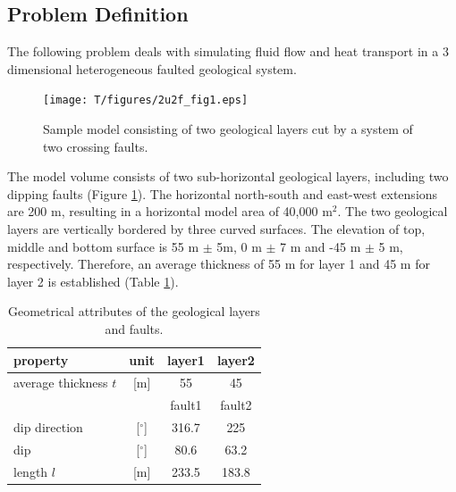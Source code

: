 \subsection{Problem Definition}

The following problem deals with simulating fluid flow and heat transport in a 3 dimensional heterogeneous faulted geological system.  
\label{sec:model}
\begin{figure}[htbp]
    \begin{center}
        \texttt{[image: T/figures/2u2f\_fig1.eps]}
        \caption{Sample model consisting of two geological layers cut by a system of two crossing faults.}
        \label{fig1}
    \end{center}
\end{figure}

The model volume consists of two sub-horizontal geological layers, including two dipping faults (Figure \ref{fig1}). The horizontal north-south and east-west extensions are 200 m, resulting in a horizontal model area of 40,000 m$^{2}$. The two geological layers are vertically bordered by three curved surfaces. The elevation of top, middle and bottom surface is 55 m $\pm{}$ 5m, 0 m $\pm{}$ 7 m and -45 m $\pm{}$ 5 m, respectively.  Therefore, an average thickness of 55 m for layer 1 and 45 m for layer 2 is established (Table \ref{tab:geometry}).

\begin{table}[htbp]
    \begin{center}
        \caption{Geometrical attributes of the geological layers and faults.}
        \begin{tabular}{lccc}
          \hline
          property & unit & layer1 & layer2\\
          \hline
          \hline
          average thickness $t$ & [m] & 55 & 45\\
          \hline
                   &      & fault1 & fault2\\
          \hline
          \hline
          dip direction & [$^\circ$] & 316.7 & 225\\
          dip & [$^\circ$] & 80.6 & 63.2\\
          length $l$ & [m] & 233.5 & 183.8\\
          \hline        
        \end{tabular}
        \label{tab:geometry}
    \end{center}
\end{table}


